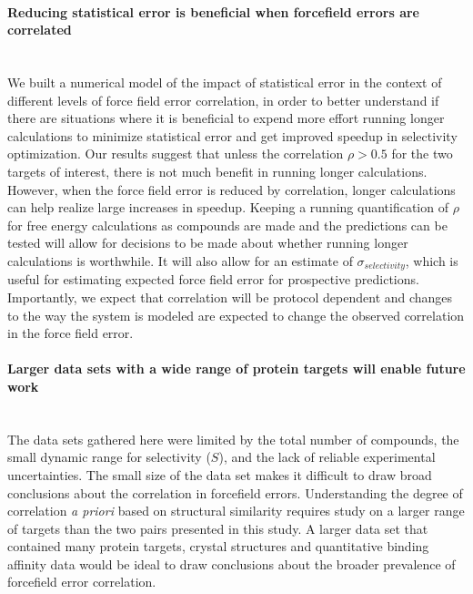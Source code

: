 \documentclass[phd,tocprelim]{cornell}
\begin{document}
\paragraph{Reducing statistical error is beneficial when forcefield errors are correlated} \mbox{}\\


We built a numerical model of the impact of statistical error in the context of different levels of force field error correlation, in order to better understand if there are situations where it is beneficial to expend more effort running longer calculations to minimize statistical error and get improved speedup in selectivity optimization. 
Our results suggest that unless the correlation $\rho > 0.5$ for the two targets of interest, there is not much benefit in running longer calculations. 
However, when the force field error is reduced by correlation, longer calculations can help realize large increases in speedup. Keeping a running quantification of $\rho$ for free energy calculations as compounds are made and the predictions can be tested will allow for decisions to be made about whether running longer calculations is worthwhile. It will also allow for an estimate of $\sigma_{selectivity}$, which is useful for estimating expected force field error for prospective predictions. Importantly, we expect that correlation will be protocol dependent and changes to the way the system is modeled are expected to change the observed correlation in the force field error. 

\paragraph{Larger data sets with a wide range of protein targets will enable future work} \mbox{}\\


The data sets gathered here were limited by the total number of compounds, the small dynamic range for selectivity ($S$), and the lack of reliable experimental uncertainties. The small size of the data set makes it difficult to draw broad conclusions about the correlation in forcefield errors. Understanding the degree of correlation \emph{a priori} based on structural similarity requires study on a larger range of targets than the two pairs presented in this study. A larger data set that contained many protein targets, crystal structures and quantitative binding affinity data would be ideal to draw conclusions about the broader prevalence of forcefield error correlation. 
\end{document}
